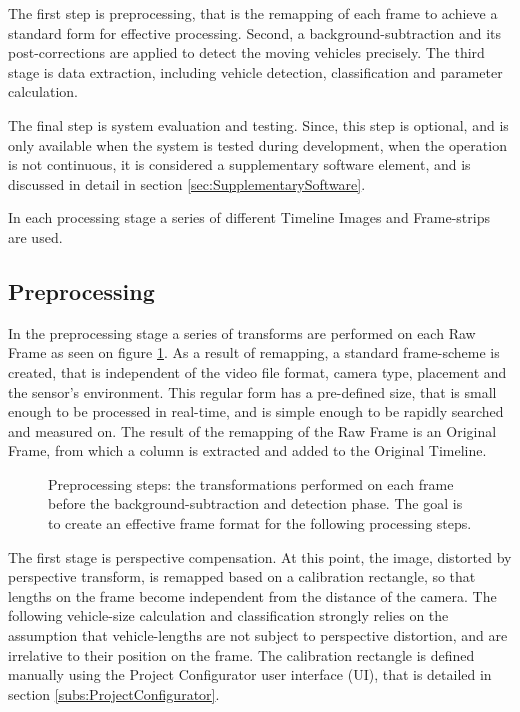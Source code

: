 The first step is preprocessing, that is the remapping of each frame to achieve a standard form for effective processing.
Second, a background-subtraction and its post-corrections are applied to detect the moving vehicles precisely.
The third stage is data extraction, including vehicle detection, classification and parameter calculation.

The final step is system evaluation and testing. 
Since, this step is optional, and is only available when the system is tested during development, when the operation is not continuous, it is considered a supplementary software element, and is discussed in detail in section \ref{sec:SupplementarySoftware}.

In each processing stage a series of different Timeline Images and Frame-strips are used.
\subsection{Preprocessing}
In the preprocessing stage a series of transforms are performed on each Raw Frame as seen on figure \ref{fig:transforms}.
As a result of remapping, a standard frame-scheme is created, that is independent of the video file format, camera type, placement and the sensor's environment.
This regular form has a pre-defined size, that is small enough to be processed in real-time, and is simple enough to be rapidly searched and measured on.
The result of the remapping of the Raw Frame is an Original Frame, from which a column is extracted and added to the Original Timeline.

\begin{figure}[!h]
	\centering
	
	\caption{Preprocessing steps: the transformations performed on each frame before the background-subtraction and detection phase. The goal is to create an effective frame format for the following processing steps.\label{fig:transforms}}
\end{figure}

The first stage is perspective compensation.
At this point, the image, distorted by perspective transform, is remapped based on a calibration rectangle, so that lengths on the frame become independent from the distance of the camera.
The following vehicle-size calculation and classification strongly relies on the assumption that vehicle-lengths are not subject to perspective distortion, and are irrelative to their position on the frame.
The calibration rectangle is defined manually using the Project Configurator user interface (UI), that is detailed in section \ref{subs:ProjectConfigurator}.

